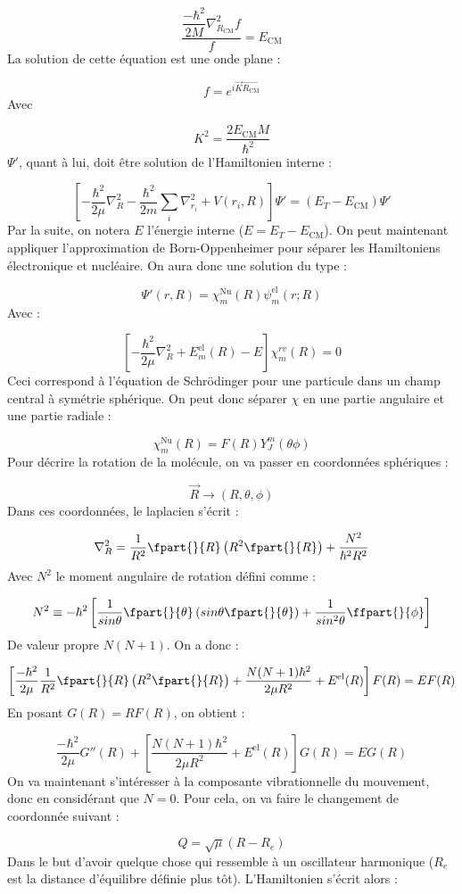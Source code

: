 \[ \dfrac{\dfrac{-\hbar^2}{2M}\nabla^2_{R_\text{CM}}f}{f} = E_\text{CM} \]
La solution de cette équation est une onde plane :


\[ f = e^{i\Vec{K}\Vec{R_\text{CM}}} \]
Avec


\[ K^2 = \dfrac{2E_\text{CM}M}{\hbar^2} \]
$\Psi'$, quant à lui, doit être solution de l'Hamiltonien interne :


\[
\left[-\dfrac{\hbar^2}{2\mu}\nabla^2_R - \dfrac{\hbar^2}{2m}\sum\limits_i \nabla^2_{r_{i}} + V(r_i, R)\right]\Psi' = (E_T-E_\text{CM})\Psi'
\]
Par la suite, on notera $E$ l'énergie interne ($E = E_T - E_\text{CM}$). On peut maintenant appliquer l'approximation de Born-Oppenheimer pour séparer les Hamiltoniens électronique et nucléaire. On aura donc une solution du type :


\[ \Psi'(r,R) = \chi^\text{Nu}_m(R)\psi^\text{el}_m(r;R) \]
Avec :


\[ \left[-\dfrac{\hbar^2}{2\mu}\nabla^2_R + E^\text{el}_m(R) - E\right] \chi^{rv}_m(R) = 0 \]
Ceci correspond à l'équation de Schrödinger pour une particule dans un champ central à symétrie sphérique. On peut donc séparer $\chi$ en une partie angulaire et une partie radiale :


\[ \chi^\text{Nu}_m(R) = F(R)Y^m_J(\theta\phi) \]
Pour décrire la rotation de la molécule, on va passer en coordonnées sphériques :


\[ \Vec{R} \rightarrow (R, \theta, \phi) \]
Dans ces coordonnées, le laplacien s'écrit :


\[ \nabla^2_R = \dfrac{1}{R^2}\fpart{}{R}\left(R^2\fpart{}{R}\right) + \dfrac{N^2}{\hbar^2R^2} \]
Avec $N^2$ le moment angulaire de rotation défini comme :


\[
N^2 \equiv -\hbar^2\left[\dfrac{1}{sin\theta}\fpart{}{\theta}\left(sin\theta\fpart{}{\theta}\right) + \dfrac{1}{sin^2\theta}\ffpart{}{\phi}\right]
\]
De valeur propre $N(N+1)$. On a donc :


\[
\left[\dfrac{-\hbar^2}{2\mu}\dfrac{1}{R^2}\fpart{}{R}\left(R^2\fpart{}{R}\right) + \dfrac{N(N+1)\hbar^2}{2\mu R^2} + E^\text{el}(R)\right]F(R) = EF(R)
\]
En posant $G(R) = RF(R)$, on obtient :


\[
\dfrac{-\hbar^2}{2\mu}G''(R) + \left[\dfrac{N(N+1)\hbar^2}{2\mu R^2} + E^\text{el}(R)\right]G(R) = EG(R)
\]
On va maintenant s'intéresser à la composante vibrationnelle du mouvement, donc en considérant que $N = 0$. Pour cela, on va faire le changement de coordonnée suivant :


\[
Q = \sqrt{\mu}(R-R_e)
\]
Dans le but d'avoir quelque chose qui ressemble à un oscillateur harmonique ($R_e$ est la distance d'équilibre définie plus tôt). L'Hamiltonien s'écrit alors :


